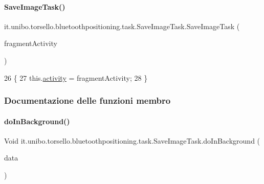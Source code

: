 \paragraph{\texorpdfstring{Save\+Image\+Task()}{SaveImageTask()}}
{\footnotesize\ttfamily it.\+unibo.\+torsello.\+bluetoothpositioning.\+task.\+Save\+Image\+Task.\+Save\+Image\+Task (\begin{DoxyParamCaption}\item[{Fragment\+Activity}]{fragment\+Activity }\end{DoxyParamCaption})}


\begin{DoxyCode}
26                                                             \{
27         this.\hyperlink{classit_1_1unibo_1_1torsello_1_1bluetoothpositioning_1_1task_1_1SaveImageTask_a340aca6a2cdcfbf41aed236588669203_a340aca6a2cdcfbf41aed236588669203}{activity} = fragmentActivity;
28     \}
\end{DoxyCode}


\subsubsection{Documentazione delle funzioni membro}
\hypertarget{classit_1_1unibo_1_1torsello_1_1bluetoothpositioning_1_1task_1_1SaveImageTask_acb2bd5f71fddebe88763fef50932beeb_acb2bd5f71fddebe88763fef50932beeb}{}\label{classit_1_1unibo_1_1torsello_1_1bluetoothpositioning_1_1task_1_1SaveImageTask_acb2bd5f71fddebe88763fef50932beeb_acb2bd5f71fddebe88763fef50932beeb} 
\paragraph{\texorpdfstring{do\+In\+Background()}{doInBackground()}}
{\footnotesize\ttfamily Void it.\+unibo.\+torsello.\+bluetoothpositioning.\+task.\+Save\+Image\+Task.\+do\+In\+Background (\begin{DoxyParamCaption}\item[{byte... \mbox{[}$\,$\mbox{]}}]{data }\end{DoxyParamCaption})\hspace{0.3cm}{\ttfamily [protected]}}


